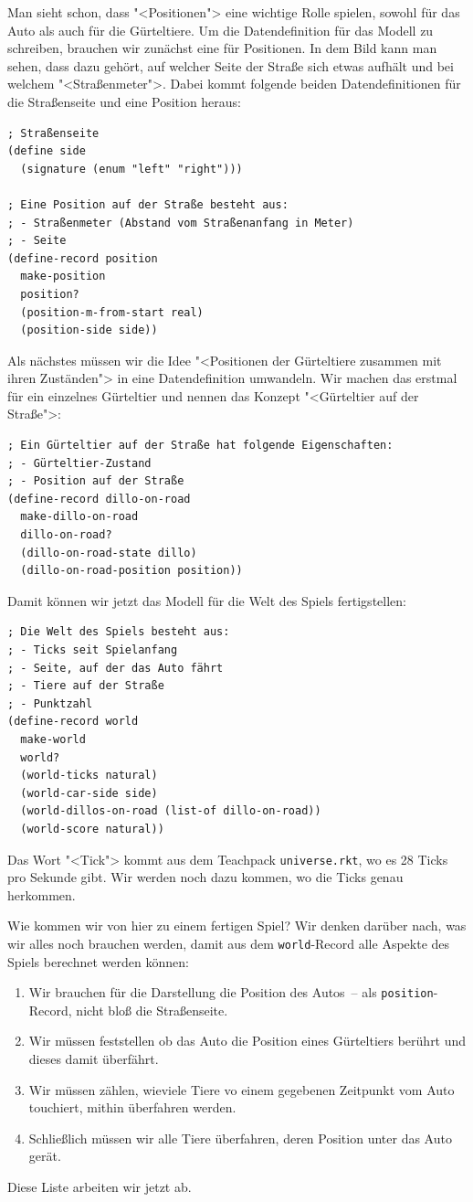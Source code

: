 Man sieht schon, dass "<Positionen"> eine wichtige Rolle spielen,
sowohl für das Auto als auch für die Gürteltiere.  Um die
Datendefinition für das Modell zu schreiben, brauchen wir zunächst
eine für Positionen.  In dem Bild kann man sehen, dass dazu gehört,
auf welcher Seite der Straße sich etwas aufhält und bei welchem
"<Straßenmeter">.  Dabei kommt folgende beiden Datendefinitionen für
die Straßenseite und eine Position heraus:
%
\begin{lstlisting}
; Straßenseite
(define side
  (signature (enum "left" "right")))

; Eine Position auf der Straße besteht aus:
; - Straßenmeter (Abstand vom Straßenanfang in Meter)
; - Seite
(define-record position
  make-position
  position?
  (position-m-from-start real)
  (position-side side))
\end{lstlisting}
%
Als nächstes müssen wir die Idee "<Positionen der Gürteltiere zusammen
mit ihren Zuständen"> in eine Datendefinition umwandeln.  Wir machen
das erstmal für ein einzelnes Gürteltier und nennen das Konzept
"<Gürteltier auf der Straße">:
%
\begin{lstlisting}
; Ein Gürteltier auf der Straße hat folgende Eigenschaften:
; - Gürteltier-Zustand
; - Position auf der Straße
(define-record dillo-on-road
  make-dillo-on-road
  dillo-on-road?
  (dillo-on-road-state dillo)
  (dillo-on-road-position position))
\end{lstlisting}
%
Damit können wir jetzt das Modell für die Welt des Spiels
fertigstellen:
%
\begin{lstlisting}
; Die Welt des Spiels besteht aus:
; - Ticks seit Spielanfang
; - Seite, auf der das Auto fährt
; - Tiere auf der Straße
; - Punktzahl
(define-record world
  make-world
  world?
  (world-ticks natural)
  (world-car-side side)
  (world-dillos-on-road (list-of dillo-on-road))
  (world-score natural))
\end{lstlisting}
%
Das Wort "<Tick"> kommt aus dem Teachpack \texttt{universe.rkt}, wo es
28 Ticks pro Sekunde gibt.  Wir werden noch dazu kommen, wo die Ticks
genau herkommen.

Wie kommen wir von hier zu einem fertigen Spiel?  Wir denken darüber
nach, was wir alles noch brauchen werden, damit aus dem
\lstinline{world}-Record alle Aspekte des Spiels berechnet werden
können:\label{page:dillo-world-todos}
%
\begin{enumerate}
\item Wir brauchen für die Darstellung die Position des Autos~-- als
  \lstinline{position}-Record, nicht bloß die Straßenseite.
\item Wir müssen feststellen ob das Auto die Position eines
  Gürteltiers berührt und dieses damit überfährt.
\item Wir müssen zählen, wieviele Tiere vo einem gegebenen
  Zeitpunkt vom Auto touchiert, mithin überfahren werden.
\item Schließlich müssen wir alle Tiere überfahren, deren Position
  unter das Auto gerät.
\end{enumerate}
%
Diese Liste arbeiten wir jetzt ab.
%
